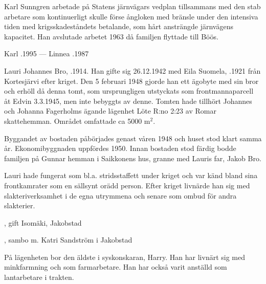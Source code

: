 Karl Sunngren arbetade på Statens järnvägars vedplan tillsammans med den stab arbetare som kontinuerligt skulle förse ångloken med bränsle under den intensiva tiden med krigsskadeståndets betalande, som hårt ansträngde järnvägens kapacitet. Han avslutade arbetet 1963 då familjen flyttade till Böös.

Karl .1995  ---  Linnea .1987



%



%
Lauri Johannes Bro, .1914. Han gifte sig 26.12.1942 med Eila Suomela, .1921 från Kortesjärvi efter kriget. Den 5 februari 1948 gjorde han ett ägobyte med sin bror  och erhöll då denna tomt, som ursprungligen utstyckats som frontmannaparcell åt Edvin 3.3.1945, men inte bebyggts av denne. Tomten hade tillhört Johannes och Johanna Fagerholms ägande lägenhet Löte R:no 2:23 av Romar skattehemman. Området omfattade ca 5000 m$^2$.

Byggandet av bostaden påbörjades genast våren 1948 och huset stod klart samma år. Ekonomibyggnaden uppfördes 1950. Innan bostaden stod färdig bodde familjen på Gunnar hemman i Saikkonens hus, granne med Lauris far, Jakob Bro.

Lauri hade fungerat som bl.a. stridsstaffett under kriget och var känd bland sina frontkamrater som en sällsynt orädd person. Efter kriget livnärde han sig med slakteriverksamhet i de egna utrymmena och senare som ombud för andra slakterier.
\begin{jhchildren}
  \item {}
  \item {}, gift Isomäki, Jakobstad
  \item {}, sambo m. Katri Sandström i Jakobstad
\end{jhchildren}

På lägenheten bor den äldste i syskonskaran, Harry. Han har livnärt sig med minkfarmning och som farmarbetare. Han har också varit anställd som lantarbetare i trakten.

